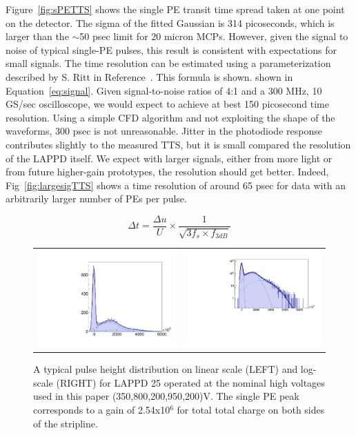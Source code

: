 \documentclass[preprint,12pt]{elsarticle}
\begin{document}
\noindent Figure~\ref{fig:sPETTS} shows the single PE transit time spread taken at one point on the detector. The sigma of the fitted Gaussian is 314 picoseconds, which is larger than the $\sim$50 psec limit for 20 micron MCPs. However, given the signal to noise of typical single-PE pulses, this result is consistent with expectations for small signals. The time resolution can be estimated using a parameterization described by S. Ritt in Reference~\cite{Ritt}. This formula is shown. shown in Equation~\ref{eq:signal}. Given signal-to-noise ratios of 4:1 and a 300 MHz, 10 GS/sec oscilloscope, we would expect to achieve at best 150 picosecond time resolution. Using a simple CFD algorithm and not exploiting the shape of the waveforms, 300 psec is not unreasonable. Jitter in the photodiode response contributes slightly to the measured TTS, but it is small compared the resolution of the LAPPD itself. We expect with larger signals, either from more light or from future higher-gain prototypes, the resolution should get better. Indeed, Fig~\ref{fig:largesigTTS} shows a time resolution of around 65 psec for data with an arbitrarily larger number of PEs per pulse.

\begin{equation}
\Delta t = \frac{\Delta u}{U} \times \frac{1}{\sqrt{3f_s \times f_{3dB}}}
\label{eq:signal}
\end{equation}






\begin{figure}
	\centering
        \begin{tabular}{l l}
                \includegraphics[width=0.42\linewidth]{plots/PulseHeightDist_notlog} &
                \includegraphics[width=0.57\linewidth]{plots/PulseHeightDist_log}\\
         \end{tabular}  
       \caption{A typical pulse height distribution on linear scale (LEFT) and log-scale (RIGHT) for LAPPD 25 operated at the nominal high voltages used in this paper (350,800,200,950,200)V. The single PE peak corresponds to a gain of 2.54x10$^6$ for total total charge on both sides of the stripline.}
	\label{fig:crossbar}
\end{figure}
\end{document}
